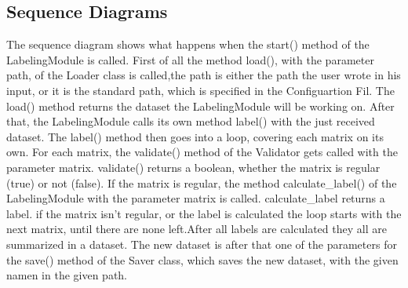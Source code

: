 \documentclass[parskip=full]{scrartcl}
\begin{document}
\subsection{Sequence Diagrams}
The sequence diagram shows what happens when the start() method of the LabelingModule is called. First of all the method load(), with the parameter path, of the Loader class is called,the path is either the path the user wrote in his input, or it is the standard path, which is specified in the Configuartion Fil. The load() method returns the dataset the LabelingModule will be working on. After that, the LabelingModule calls its own method label() with the just received dataset. The label() method then goes into a loop, covering each matrix on its own.
For each matrix, the validate() method of the Validator gets called with the parameter matrix. validate() returns a boolean, whether the matrix is regular (true) or not (false).
If the matrix is regular, the method calculate\_label() of the LabelingModule with the parameter matrix is called. calculate\_label returns a \gls{label}. if the matrix isn't regular, or the \gls{label} is calculated the loop starts with the next matrix, until there are none left.After all \glspl{label} are calculated they all are summarized in a dataset.
The new dataset is after that one of the parameters for the save() method of the Saver class, which saves the new dataset, with the given namen in the given path.

\newpage
\begin{figure}[h]
\begin{center}

\label{Activity Diagrams}
\end{center}
\end{figure}
\newpage
\end{document}
